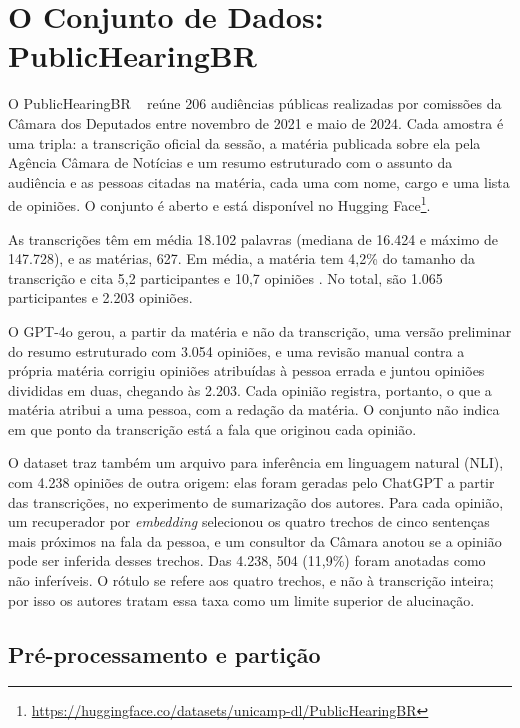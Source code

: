\section{O Conjunto de Dados: PublicHearingBR}
\label{sec:dados}

O PublicHearingBR ~\citep{fernandes2024publichearingbr} reúne 206 audiências públicas realizadas por
comissões da Câmara dos Deputados entre novembro de 2021 e maio de 2024. Cada amostra é uma tripla: a
transcrição oficial da sessão, a matéria publicada sobre ela pela Agência Câmara de Notícias e um resumo
estruturado com o assunto da audiência e as pessoas citadas na matéria, cada uma com nome, cargo e uma
lista de opiniões. O conjunto é aberto e está disponível no Hugging Face\footnote{\url{https://huggingface.co/datasets/unicamp-dl/PublicHearingBR}}.

As transcrições têm em média 18.102 palavras (mediana de 16.424 e máximo de 147.728), e as matérias,
627. Em média, a matéria tem 4,2\% do tamanho da transcrição e cita 5,2 participantes e 10,7 opiniões
\citep{fernandes2024publichearingbr}. No total, são 1.065 participantes e 2.203 opiniões.

O GPT-4o gerou, a partir da matéria e não da transcrição, uma versão preliminar do resumo estruturado
com 3.054 opiniões, e uma revisão manual contra a própria matéria corrigiu opiniões atribuídas à pessoa
errada e juntou opiniões divididas em duas, chegando às 2.203. Cada opinião registra, portanto, o que a
matéria atribui a uma pessoa, com a redação da matéria. O conjunto não indica em que ponto da
transcrição está a fala que originou cada opinião.

O dataset traz também um arquivo para inferência em linguagem natural (NLI), com 4.238 opiniões de
outra origem: elas foram geradas pelo ChatGPT a partir das transcrições, no experimento de sumarização
dos autores. Para cada opinião, um recuperador por \textit{embedding} selecionou os quatro trechos de
cinco sentenças mais próximos na fala da pessoa, e um consultor da Câmara anotou se a opinião pode ser
inferida desses trechos. Das 4.238, 504 (11,9\%) foram anotadas como não inferíveis. O rótulo se refere
aos quatro trechos, e não à transcrição inteira; por isso os autores tratam essa taxa como um limite
superior de alucinação.

\subsection{Pré-processamento e partição}
\label{sec:dados-particao}

